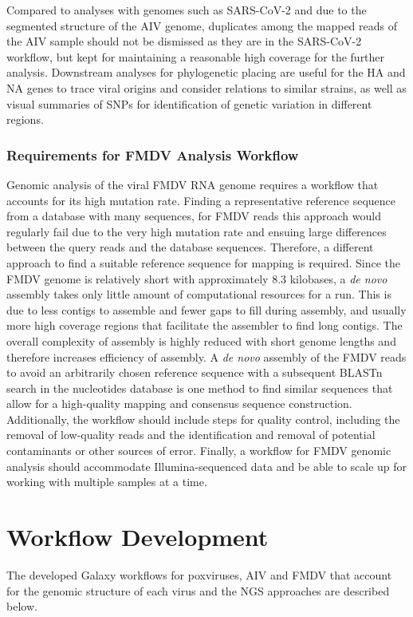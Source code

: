 Compared to analyses with genomes such as \ac{SARS-CoV-2} and due to the segmented structure of the \ac{AIV} genome, duplicates among the mapped reads of the \ac{AIV} sample should not be dismissed as they are in the \ac{SARS-CoV-2} workflow, but kept for maintaining a reasonable high coverage for the further analysis. Downstream analyses for phylogenetic placing are useful for the \ac{HA} and \ac{NA} genes to trace viral origins and consider relations to similar strains, as well as visual summaries of \acp{SNP} for identification of genetic variation in different regions.

\subsubsection{Requirements for FMDV Analysis Workflow}
Genomic analysis of the viral \ac{FMDV} \ac{RNA} genome requires a workflow that accounts for its high mutation rate. Finding a representative reference sequence from a database with many sequences, for \ac{FMDV} reads this approach would regularly fail due to the very high mutation rate and ensuing large differences between the query reads and the database sequences. Therefore, a different approach to find a suitable reference sequence for mapping is required. Since the \ac{FMDV} genome is relatively short with approximately 8.3 kilobases, a \textit{de novo} assembly takes only little amount of computational resources for a run. This is due to less contigs to assemble and fewer gaps to fill during assembly, and usually more high coverage regions that facilitate the assembler to find long contigs. The overall complexity of assembly is highly reduced with short genome lengths and therefore increases efficiency of assembly. %
A \textit{de novo} assembly of the \ac{FMDV} reads to avoid an arbitrarily chosen reference sequence with a subsequent \ac{BLAST}n search in the nucleotides database is one method to find similar sequences that allow for a high-quality mapping and consensus sequence construction.\\
Additionally, the workflow should include steps for quality control, including the removal of low-quality reads and the identification and removal of potential contaminants or other sources of error. Finally, a workflow for \ac{FMDV} genomic analysis should accommodate Illumina-sequenced data and be able to scale up for working with multiple samples at a time.

\section{Workflow Development}
The developed Galaxy workflows for poxviruses, \ac{AIV} and \ac{FMDV} that account for the genomic structure of each virus and the \ac{NGS} approaches are described below.


